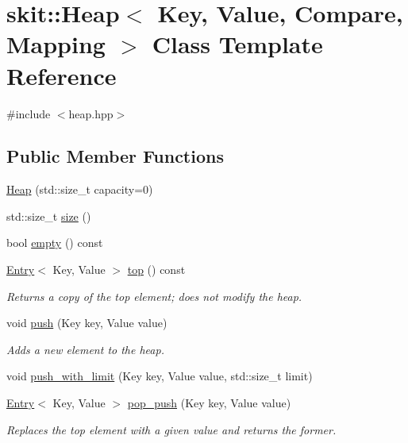 \hypertarget{classskit_1_1Heap}{}\section{skit\+:\+:Heap$<$ Key, Value, Compare, Mapping $>$ Class Template Reference}
\label{classskit_1_1Heap}


{\ttfamily \#include $<$heap.\+hpp$>$}

\subsection*{Public Member Functions}
\begin{DoxyCompactItemize}
\item 
\hyperlink{classskit_1_1Heap_a4a2cfb1a7cea4ad365b8eaae3c9d6d0d}{Heap} (std\+::size\+\_\+t capacity=0)
\item 
std\+::size\+\_\+t \hyperlink{classskit_1_1Heap_a2554aa9ba79c36a1b570ef1b7109b088}{size} ()
\item 
bool \hyperlink{classskit_1_1Heap_a0614d39d1cec881a7cdf052ba2070f91}{empty} () const
\item 
\hyperlink{structskit_1_1Entry}{Entry}$<$ Key, Value $>$ \hyperlink{classskit_1_1Heap_a2bab9895048623764dff0831ad68aed0}{top} () const
\begin{DoxyCompactList}\small\item\em Returns a copy of the top element; does not modify the heap. \end{DoxyCompactList}\item 
void \hyperlink{classskit_1_1Heap_a70915cf2b9b4b495bb145ac0e32f5a17}{push} (Key key, Value value)
\begin{DoxyCompactList}\small\item\em Adds a new element to the heap. \end{DoxyCompactList}\item 
void \hyperlink{classskit_1_1Heap_afb1f1b5ed8b5d74aee731f45729025f7}{push\+\_\+with\+\_\+limit} (Key key, Value value, std\+::size\+\_\+t limit)
\item 
\hyperlink{structskit_1_1Entry}{Entry}$<$ Key, Value $>$ \hyperlink{classskit_1_1Heap_a46c0cfa161ca8f50863747204d0a1372}{pop\+\_\+push} (Key key, Value value)
\begin{DoxyCompactList}\small\item\em Replaces the top element with a given value and returns the former. \end{DoxyCompactList}\item 

\end{DoxyCompactItemize}
